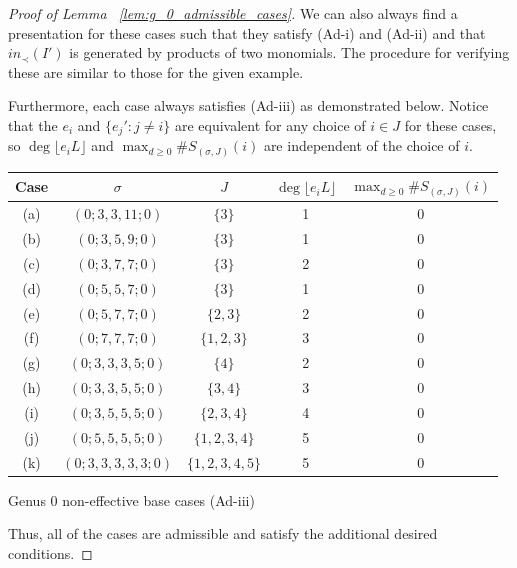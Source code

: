 \documentclass{amsart}
\theoremstyle{plain}
\theoremstyle{definition}
\theoremstyle{remark}
\numberwithin{equation}{section}
\begin{document}
\begin{proof}[Proof of Lemma ~\ref{lem:g_0_admissible_cases}]
We can also always find a presentation for these cases such that
they satisfy (Ad-i) and (Ad-ii) and that $in_\prec(I')$ is
generated by products of two monomials. The procedure for
verifying these are similar to those for the given example.

Furthermore, each case always satisfies (Ad-iii) as demonstrated below.
Notice that the $e_i$ and $\{e_j' : j \neq i\}$ are equivalent
for any choice of $i \in J$ for these cases, so $\deg \lfloor e_i L
\rfloor$ and $\max_{d \geq 0} \#S_{(\sigma, J)}(i)$ are
independent of the choice of $i$.

\begin{longtable}
	{| c | c | c || c | c |}
	\hline
	Case & $\sigma$ & $J$ & $\deg \lfloor e_i L \rfloor$ &
	$\max_{d \geq 0} \#S_{(\sigma, J)}(i)$ \\
	\hline
	\hline

	(a) & $(0; 3, 3, 11; 0)$ & $\{3\}$ & 1 & 0 \\	\hline
	
	(b) & $(0; 3, 5, 9; 0)$ & $\{3\}$ & 1 & 0 \\ \hline
	
	(c) & $(0; 3, 7, 7; 0)$ & $\{3\}$ & 2 & 0 \\ \hline
	
	(d) & $(0; 5, 5, 7; 0)$ & $\{3\}$ & 1 & 0 \\ \hline
	
	(e) & $(0; 5, 7, 7; 0)$ & $\{2, 3\}$ & 2 & 0 \\ \hline

	(f) & $(0; 7, 7, 7; 0)$ & $\{1, 2, 3\}$ & 3 & 0 \\ \hline

	(g) & $(0; 3, 3, 3, 5; 0)$ & $\{4\}$ & 2 & 0 \\ \hline
	
	(h) & $(0; 3, 3, 5, 5; 0)$ & $\{3, 4\}$ & 3 & 0 \\ \hline
	
	(i) & $(0; 3, 5, 5, 5; 0)$ & $\{2, 3, 4\}$ & 4 & 0 \\ \hline
	
	(j) & $(0; 5, 5, 5, 5; 0)$ & $\{1, 2, 3, 4\}$ & 5 & 0 \\ \hline

	(k) & $(0; 3, 3, 3, 3, 3; 0)$ & $\{1, 2, 3, 4, 5\}$ & 5 & 0 \\ \hline
\end{longtable}

\begin{center}
Genus 0 non-effective base cases (Ad-iii)
\end{center}

Thus, all of the cases are admissible and satisfy the additional
desired conditions.
\end{proof}
\end{document}
